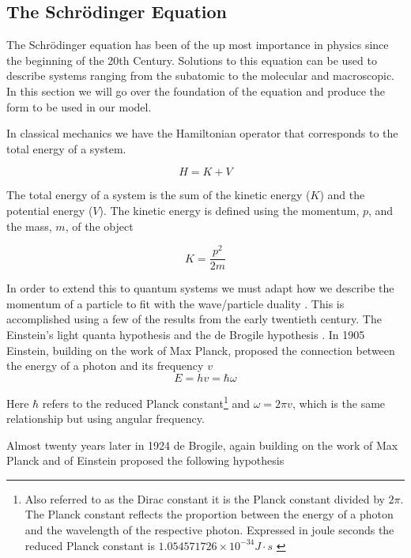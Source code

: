 \documentclass[authoryearcitations]{UoYCSproject}
\begin{document}
\subsection{The Schr\"{o}dinger Equation}
The Schr\"{o}dinger equation has been of the up most importance in physics since the beginning of the 20th Century. Solutions
to this equation can be used to describe systems ranging from the subatomic to the molecular and macroscopic. In this
section we will go over the foundation of the equation and produce the form to be used in our model. 

In classical mechanics we have the Hamiltonian operator that corresponds to the total
energy of a system. 

\begin{equation}
        H = K + V
\label{eq:totalEnergy}
\end{equation}

The total energy of a system is the sum of the kinetic energy ($K$) and the potential energy ($V$).
The kinetic energy is defined using the momentum, $p$, and the mass, $m$, of the object

\begin{equation}
        K = \frac{p^2}{2m}
\label{eq:K}
\end{equation}

In order to extend this to quantum systems we must adapt how we describe the momentum of a particle to
fit with the wave/particle duality \cite{qp}. This is accomplished using a few of the results from the early 
twentieth century. The Einstein's light quanta hypothesis and the de Brogile hypothesis \cite{qp, ricardo}. In 
1905 Einstein, building on the work of Max Planck,  
proposed the connection between the energy of a photon and its frequency $v$
\begin{equation}
E = hv = \hbar\omega
\label{einsteinHyp}
\end{equation}


Here $\hbar$ refers to the reduced Planck constant\footnote{Also referred to as the Dirac constant it is
the Planck constant divided by $2\pi$. The Planck constant reflects the proportion between the energy of a photon
and the wavelength of the respective photon. Expressed in joule seconds the reduced Planck constant is 
$1.054571726 \times 10^{-34} J \cdot s $ \cite{qp} } and $\omega = 2\pi v$, which is the same relationship
but using angular frequency. 

Almost twenty years later in 1924 de Brogile, again building on the work of Max Planck and of Einstein proposed
the following hypothesis
\end{document}
